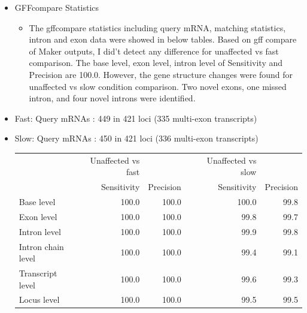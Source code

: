 \documentclass[11pt]{article}
\begin{document}
\begin{itemize}
\begin{itemize}
\item GFFcompare Statistics

\begin{itemize}
\item The gffcompare statistics including query mRNA, matching statistics, intron and exon data were showed in below tables. Based on gff compare of Maker outputs, I did't detect any difference for unaffected vs fast comparison. The base level, exon level, intron level of 
        Sensitivity and Precision are 100.0. However, the gene structure changes were found for unaffected vs slow condition comparison. Two novel exons,
        one missed intron, and four novel introns were identified.
\end{itemize}

\item Fast:    Query mRNAs :     449 in     421 loci  (335 multi-exon transcripts)
\item Slow:    Query mRNAs :     450 in     421 loci  (336 multi-exon transcripts)

\begin{center}
\begin{tabular}{lrrlrr}
                     &  Unaffected vs fast  &             &     &  Unaffected vs slow  &             \\
                     &         Sensitivity  &  Precision  &     &         Sensitivity  &  Precision  \\
 Base level          &               100.0  &      100.0  &     &               100.0  &       99.8  \\
 Exon level          &               100.0  &      100.0  &     &                99.8  &       99.7  \\
 Intron level        &               100.0  &      100.0  &     &                99.9  &       99.8  \\
 Intron chain level  &               100.0  &      100.0  &     &                99.4  &       99.1  \\
 Transcript level    &               100.0  &      100.0  &     &                99.6  &       99.3  \\
 Locus level         &               100.0  &      100.0  &     &                99.5  &       99.5  \\
\end{tabular}
\end{center}


\end{itemize}


\end{itemize}
\end{document}
